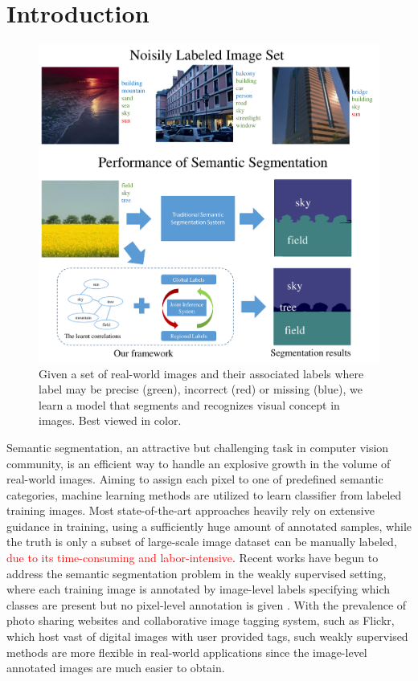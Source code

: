 \section{Introduction}

\begin{figure}[t]
\begin{center}
    \includegraphics[width=1\linewidth]{fig_noisyparsing.pdf}
\end{center}
    \caption{Given a set of real-world images and their associated labels where label may be precise (green), incorrect (red) or missing (blue), we learn a model that segments and recognizes visual concept in images. Best viewed in color.}
\label{fig:noisyparsing}
\vspace{-3mm}
\end{figure}

Semantic segmentation, an attractive but challenging task in computer vision community, is an efficient way to handle an explosive growth in the volume of real-world images. Aiming to assign each pixel to one of predefined semantic categories, machine learning methods are utilized to learn classifier from labeled training images. Most state-of-the-art approaches heavily rely on extensive guidance in training, using a sufficiently huge amount of annotated samples, while the truth is only a subset of large-scale image dataset can be manually labeled, \textcolor{red}{due to its time-consuming and labor-intensive}. Recent works have begun to address the semantic segmentation problem in the weakly supervised setting, where each training image is annotated by image-level labels specifying which classes are present but no pixel-level annotation is given \cite{verbeek2007region,vezhnevets2010towards,vezhnevets2011weakly,vezhnevets2012weakly,xu2014tell,zhang2013sparse,zhang2013probabilistic}. With the prevalence of photo sharing websites and collaborative image tagging system, such as Flickr, which host vast of digital images with user provided tags, such weakly supervised methods are more flexible in real-world applications since the image-level annotated images are much easier to obtain.

